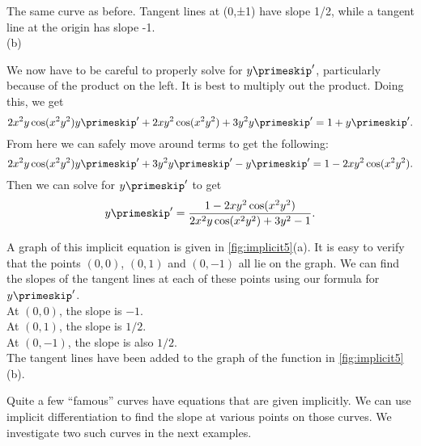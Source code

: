 \begin{example}
{{}{The same curve as before.  Tangent lines at (0,±1) have slope 1/2, while a tangent line at the origin has slope -1.}
\\ (b)}

We now have to be careful to properly solve for $y\primeskip'$, particularly because of the product on the left.  It is best to multiply out the product.  Doing this, we get
\[2x^2y\cos(x^2y^2)y\primeskip' + 2xy^2\cos(x^2y^2) + 3y^2y\primeskip' = 1 + y\primeskip'.\]
From here we can safely move around terms to get the following:
\[2x^2y\cos(x^2y^2)y\primeskip' + 3y^2y\primeskip' - y\primeskip' = 1 - 2xy^2\cos(x^2y^2).\]
Then we can solve for $y\primeskip'$ to get
\[y\primeskip' = \frac{1 - 2xy^2\cos(x^2y^2)}{2x^2y\cos(x^2y^2)+3y^2-1}.\]

A graph of this implicit equation is given in \autoref{fig:implicit5}(a). It is easy to verify that the points $(0,0)$, $(0,1)$ and $(0,-1)$ all lie on the graph. We can find the slopes of the tangent lines at each of these points using our formula for $y\primeskip'$.\\
At $(0,0)$, the slope is $-1$.\\
At $(0,1)$, the slope is $1/2$.\\
At $(0,-1)$, the slope is also $1/2$.\\
The tangent lines have been added to the graph of the function in \autoref{fig:implicit5}(b).
\end{example}

Quite a few ``famous'' curves have equations that are given implicitly.  We can use implicit differentiation to find the slope at various points on those curves. We investigate two such curves in the next examples.\bigskip

